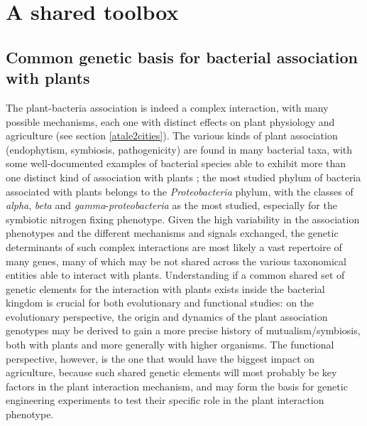 
\logvartrue
\chapter{A shared toolbox}
\label{chap:alpha}

\section{Common genetic basis for bacterial association with plants}
The plant-bacteria association is indeed a complex interaction, with many possible mechanisms, each one with distinct effects on plant physiology and agriculture (see section \ref{atale2cities}). The various kinds of plant association (endophytism, symbiosis, pathogenicity) are found in many bacterial taxa, with some well-documented examples of bacterial species able to exhibit more than one distinct kind of association with plants \cite{bashan2004azospirillum} \cite{chi2005ascending}; the most studied phylum of bacteria associated with plants belongs to the \textit{Proteobacteria} phylum, with the classes of \textit{alpha}, \textit{beta} and \textit{gamma}-\textit{proteobacteria} as the most studied, especially for the symbiotic nitrogen fixing phenotype. Given the high variability in the association phenotypes and the different mechanisms and signals exchanged, the genetic determinants of such complex interactions are most likely a vast repertoire of many genes, many of which may be not shared across the various taxonomical entities able to interact with plants. Understanding if a common shared set of genetic elements for the interaction with plants exists inside the bacterial kingdom is crucial for both evolutionary and functional studies: on the evolutionary perspective, the origin and dynamics of the plant association genotypes may be derived to gain a more precise history of mutualism/symbiosis, both with plants and more generally with higher organisms. The functional perspective, however, is the one that would have the biggest impact on agriculture, because such shared genetic elements will most probably be key factors in the plant interaction mechanism, and may form the basis for genetic engineering experiments to test their specific role in the plant interaction phenotype.

